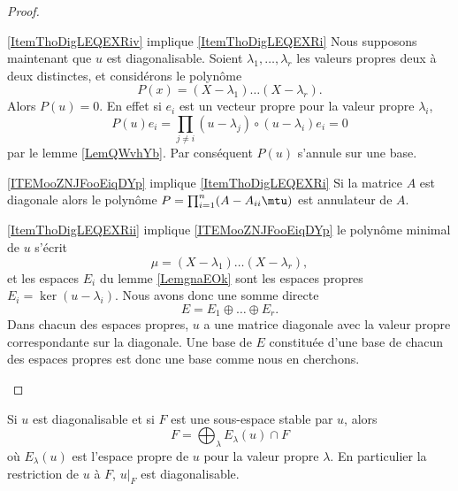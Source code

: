 \begin{proof}
\begin{subproof}
\item[\ref{ItemThoDigLEQEXRiv} implique \ref{ItemThoDigLEQEXRi}] Nous supposons maintenant que \( u\) est diagonalisable. Soient \( \lambda_1,\ldots, \lambda_r\) les valeurs propres deux à deux distinctes, et considérons le polynôme
    \begin{equation}
        P(x)=(X-\lambda_1)\ldots (X-\lambda_r).
    \end{equation}
    Alors \( P(u)=0\). En effet si \( e_i\) est un vecteur propre pour la valeur propre \( \lambda_i\), 
    \begin{equation}
        P(u)e_i=\prod_{j\neq i}(u-\lambda_j)\circ(u-\lambda_i)e_i=0
    \end{equation}
    par le lemme \ref{LemQWvhYb}. Par conséquent \( P(u)\) s'annule sur une base.

\item[\ref{ITEMooZNJFooEiqDYp} implique \ref{ItemThoDigLEQEXRi}]
    Si la matrice \( A\) est diagonale alors le polynôme \( P=\prod_{i=1}^n(A-A_{ii}\mtu)\) est annulateur de \( A\).
        \item[\ref{ItemThoDigLEQEXRii} implique \ref{ITEMooZNJFooEiqDYp}]
            le polynôme minimal de \( u\) s'écrit 
            \begin{equation}
                \mu=(X-\lambda_1)\ldots(X-\lambda_r),
            \end{equation}
            et les espaces $E_i$ du lemme \ref{LemgnaEOk} sont les espaces propres \( E_i=\ker(u-\lambda_i)\). Nous avons donc une somme directe
            \begin{equation}
                E=E_1\oplus\ldots\oplus E_r.
            \end{equation}
            Dans chacun des espaces propres, $u$ a une matrice diagonale avec la valeur propre correspondante sur la diagonale. Une base de \( E\) constituée d'une base de chacun des espaces propres est donc une base comme nous en cherchons.
    \end{subproof}
\end{proof}

\begin{corollary}       \label{CorQeVqsS}
    Si \( u\) est diagonalisable et si \( F\) est une sous-espace stable par \( u\), alors
    \begin{equation}
        F=\bigoplus_{\lambda}E_{\lambda}(u)\cap F
    \end{equation}
    où \( E_{\lambda}(u)\) est l'espace propre de \( u\) pour la valeur propre \( \lambda\). En particulier la restriction de \( u\) à \( F\), \( u|_F\) est diagonalisable.
\end{corollary}

